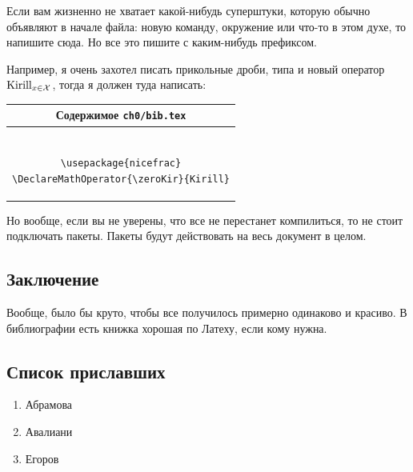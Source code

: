 Если вам жизненно не хватает какой-нибудь суперштуки, которую обычно объявляют в начале файла: новую команду, окружение или что-то в этом духе, то напишите сюда. Но все это пишите с каким-нибудь префиксом.

Например, я очень захотел писать прикольные дроби, типа  и новый оператор $\zeroKir\limits_{x\in\SetX}$, тогда я должен туда написать:

\begin{center}
\begin{tabular}{|c|}
\hline
        Содержимое \texttt{ch0/bib.tex}

\\ \hline        
        \begin{minipage}{6in}
                \begin{verbatim}

\usepackage{nicefrac}
\DeclareMathOperator{\zeroKir}{Kirill}
                \end{verbatim}
        \end{minipage}
\\ \hline
\end{tabular}
\end{center}
Но вообще, если вы не уверены, что все не перестанет компилиться, то не стоит подключать пакеты.
Пакеты будут действовать на весь документ в целом.


\subsection{Заключение}

Вообще, было бы круто, чтобы все получилось примерно одинаково и красиво. В библиографии есть книжка хорошая по Латеху, если кому нужна.

\subsection{Список приславших} 

\begin{enumerate}
    \item Абрамова
    \item Авалиани
    \item Егоров
\end{enumerate}